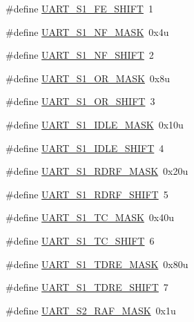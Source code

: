 \begin{DoxyCompactItemize}
\item 
\#define \hyperlink{group___u_a_r_t___register___masks_ga2795a7498ce3e3d09703c4cec6378531}{U\+A\+R\+T\+\_\+\+S1\+\_\+\+F\+E\+\_\+\+S\+H\+I\+FT}~1
\item 
\#define \hyperlink{group___u_a_r_t___register___masks_gadfaa4f856facd373c0441b6e89bd87ba}{U\+A\+R\+T\+\_\+\+S1\+\_\+\+N\+F\+\_\+\+M\+A\+SK}~0x4u
\item 
\#define \hyperlink{group___u_a_r_t___register___masks_ga7b2eb195cce2f086cd1b0c136eced375}{U\+A\+R\+T\+\_\+\+S1\+\_\+\+N\+F\+\_\+\+S\+H\+I\+FT}~2
\item 
\#define \hyperlink{group___u_a_r_t___register___masks_gac8102fb901477551dcc8505b3afb5272}{U\+A\+R\+T\+\_\+\+S1\+\_\+\+O\+R\+\_\+\+M\+A\+SK}~0x8u
\item 
\#define \hyperlink{group___u_a_r_t___register___masks_ga34422d4914b457201229c9e14c74ced6}{U\+A\+R\+T\+\_\+\+S1\+\_\+\+O\+R\+\_\+\+S\+H\+I\+FT}~3
\item 
\#define \hyperlink{group___u_a_r_t___register___masks_gac1b555f14295616d01152013fe7704b9}{U\+A\+R\+T\+\_\+\+S1\+\_\+\+I\+D\+L\+E\+\_\+\+M\+A\+SK}~0x10u
\item 
\#define \hyperlink{group___u_a_r_t___register___masks_gaf3efb8b468c18b3060dfc91b94256f82}{U\+A\+R\+T\+\_\+\+S1\+\_\+\+I\+D\+L\+E\+\_\+\+S\+H\+I\+FT}~4
\item 
\#define \hyperlink{group___u_a_r_t___register___masks_gab62f7e1b8548b5bbe5686f31c4beae61}{U\+A\+R\+T\+\_\+\+S1\+\_\+\+R\+D\+R\+F\+\_\+\+M\+A\+SK}~0x20u
\item 
\#define \hyperlink{group___u_a_r_t___register___masks_ga346046d0c13d06cc9c382967d1efc56e}{U\+A\+R\+T\+\_\+\+S1\+\_\+\+R\+D\+R\+F\+\_\+\+S\+H\+I\+FT}~5
\item 
\#define \hyperlink{group___u_a_r_t___register___masks_ga8a78686c3c82eeb352b85f0699361558}{U\+A\+R\+T\+\_\+\+S1\+\_\+\+T\+C\+\_\+\+M\+A\+SK}~0x40u
\item 
\#define \hyperlink{group___u_a_r_t___register___masks_ga400fc3dbecf13c75447bbc006c49bdbc}{U\+A\+R\+T\+\_\+\+S1\+\_\+\+T\+C\+\_\+\+S\+H\+I\+FT}~6
\item 
\#define \hyperlink{group___u_a_r_t___register___masks_gaa7d30e83d1a7d0a544393186508a667e}{U\+A\+R\+T\+\_\+\+S1\+\_\+\+T\+D\+R\+E\+\_\+\+M\+A\+SK}~0x80u
\item 
\#define \hyperlink{group___u_a_r_t___register___masks_ga5c58dab9e10b6e9c41ecf6999b56ea0c}{U\+A\+R\+T\+\_\+\+S1\+\_\+\+T\+D\+R\+E\+\_\+\+S\+H\+I\+FT}~7
\item 
\#define \hyperlink{group___u_a_r_t___register___masks_gaa16c5c48ff5ecf080e485880145828c0}{U\+A\+R\+T\+\_\+\+S2\+\_\+\+R\+A\+F\+\_\+\+M\+A\+SK}~0x1u

\end{DoxyCompactItemize}
